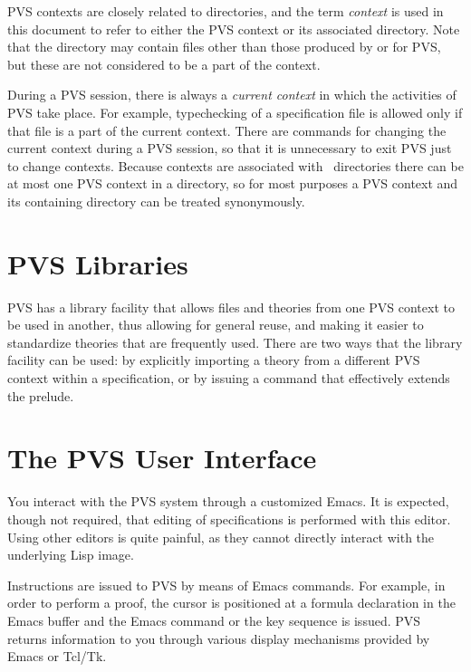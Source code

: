 PVS contexts are closely related to directories, and the term
\emph{context} is used in this document to refer to either the PVS context
or its associated directory.  Note that the directory may contain files
other than those produced by or for PVS, but these are not considered to
be a part of the context.

During a PVS session, there is always a \emph{current
context} in which the activities of PVS take
place.  For example, typechecking of a specification file is allowed only
if that file is a part of the current context.  There are commands for
changing the current context during a PVS session, so that it is
unnecessary to exit PVS just to change contexts.  Because contexts are
associated with \unix\ directories there can be at most one PVS context
in a directory, so for most purposes a PVS context and its containing
directory can be treated synonymously.

\section*{PVS Libraries}

PVS has a library facility that allows files and theories from one PVS
context to be used in another, thus allowing for general reuse, and making
it easier to standardize theories that are frequently used.  There are two
ways that the library facility can be used: by explicitly importing a
theory from a different PVS context within a specification, or by issuing
a command that effectively extends the prelude.


\section*{The PVS User Interface}

You interact with the PVS system through a customized Emacs.  It is expected, though
not required, that editing of specifications is performed with this editor.
Using other editors is quite painful, as they cannot directly interact
with the underlying Lisp image.

Instructions are issued to PVS by means of Emacs commands.  For example,
in order to perform a proof, the cursor is positioned at a formula
declaration in the Emacs buffer and the Emacs command  or
the key sequence  is issued.  PVS returns information to you
through various display mechanisms provided by Emacs or Tcl/Tk.

